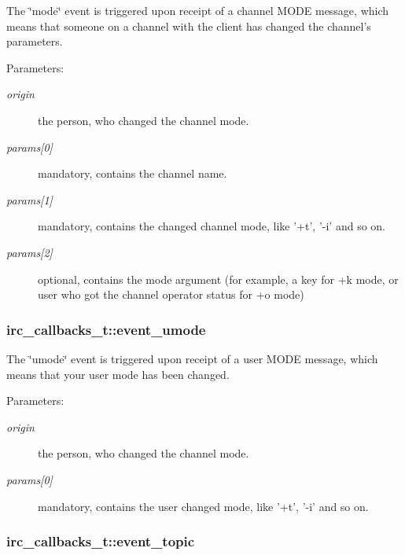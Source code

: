 The \char`\"{}mode\char`\"{} event is triggered upon receipt of a channel MODE message, which means that someone on a channel with the client has changed the channel's parameters.

\begin{Desc}
\item[Parameters:]
\begin{description}
\item[{\em origin}]the person, who changed the channel mode. \item[{\em params\mbox{[}0\mbox{]}}]mandatory, contains the channel name. \item[{\em params\mbox{[}1\mbox{]}}]mandatory, contains the changed channel mode, like '+t', '-i' and so on. \item[{\em params\mbox{[}2\mbox{]}}]optional, contains the mode argument (for example, a key for +k mode, or user who got the channel operator status for +o mode) \end{description}
\end{Desc}
\hypertarget{structirc__callbacks__t_a92693d9acb2013f6f4b54301ee54d61}{
\subsubsection[event\_\-umode]{ {\bf irc\_\-callbacks\_\-t::event\_\-umode}}}
\label{structirc__callbacks__t_a92693d9acb2013f6f4b54301ee54d61}


The \char`\"{}umode\char`\"{} event is triggered upon receipt of a user MODE message, which means that your user mode has been changed.

\begin{Desc}
\item[Parameters:]
\begin{description}
\item[{\em origin}]the person, who changed the channel mode. \item[{\em params\mbox{[}0\mbox{]}}]mandatory, contains the user changed mode, like '+t', '-i' and so on. \end{description}
\end{Desc}
\hypertarget{structirc__callbacks__t_8a5ab3ffc89e19d5748c58bb675436b5}{
\subsubsection[event\_\-topic]{ {\bf irc\_\-callbacks\_\-t::event\_\-topic}}}
\label{structirc__callbacks__t_8a5ab3ffc89e19d5748c58bb675436b5}


